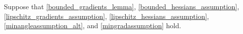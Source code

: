 Suppose that \cref{bounded_gradients_lemma}, \cref{bounded_hessians_assumption}, \cref{lipschitz_gradients_assumption}, \cref{lipschitz_hessians_assumption}, \cref{minangleassumption_alt}, and \cref{mingradassumption} hold.
